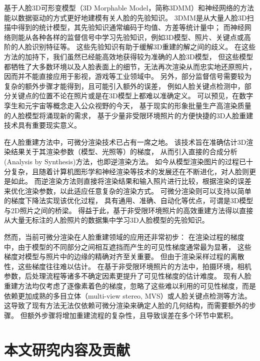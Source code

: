 基于人脸3D可形变模型（3D Morphable Model，简称3DMM）和神经网络的方法能以数据驱动的方式更好地建模有关人脸的先验知识。
3DMM是从大量人脸3D扫描中得到的统计模型，其先验知识通常编码于均值、方差等统计量中；
而神经网络则能从各种各样的监督信号中学习先验知识，例如3D模型、照片、关键点或高阶的人脸识别特征等。
这些先验知识有助于缓解3D重建的解之间的歧义。
在这些方法的加持下，我们虽然已经能高效地获得较为准确的人脸3D模型，
但这些模型都牺牲了大多数环境以及人脸表面上的细节，无法再次渲染从而忠实地还原照片，
因而并不能直接应用于影视，游戏等工业领域中。
另外，部分监督信号需要较为复杂的额外步骤才能得到，且可能引入额外的误差，
例如人脸关键点检测中，部分关键点的位置不论在照片或是在3D模型上都难以准确定义。
可以预见，在数字孪生和元宇宙等概念走入公众视野的今天，
基于现实的形象批量生产高渲染质量的人脸模型将涌现新的需求，
基于少量非受限环境照片的方便快捷的3D人脸重建技术具有重要现实意义。

在人脸重建方法中，可微分渲染技术已占有一席之地。
该技术旨在准确估计3D渲染结果关于其渲染参数（模型、光照等）的梯度，
从而引入直接的合成分析(Analysis by Synthesis)方法，也即逆渲染方法。
如今从模型渲染图片的过程已十分复杂，且随着计算机图形学和神经渲染等技术的发展还在不断进化，对人脸则更是如此。
而逆渲染方法则直接将渲染结果和输入照片进行比较，根据渲染的误差来优化渲染参数，以此适应任意复杂的渲染方式。
可微分渲染则可以支持以简单的梯度下降法实现该优化过程，
具有通用、准确、自动化等优点，可谓是3D模型与2D照片之间的桥梁。
得益于此，基于非受限环境照片的高效重建方法得以直接从大量无标注的人脸照片的数据集中学习3D人脸模型的先验知识。

然而，当前可微分渲染在人脸重建领域的应用还非常初步：
在渲染过程的梯度中，由于模型的不同部分之间相互遮挡而产生的可见性梯度通常最为显著，
这些梯度对模型与照片中的边缘的精确对齐至关重要。
但由于渲染采样过程的离散性，这些梯度往往难以估计。
在基于非受限环境照片的方法中，拍摄环境，相机参数，后处理流程等诸多不确定因素更提升了可见性梯度的估计难度。
现有人脸重建方法均仅考虑了逐像素着色的梯度，忽略了这些难以利用的可见性梯度，而是依赖更加成熟的多目立体（multi-view stereo, MVS）或人脸关键点检测等方法。
这导致了现有方法无法仅依赖可微分渲染来确定人脸的几何结构，而需要额外的步骤。
但额外步骤将增加重建流程的复杂性，且导致误差在多个环节中累积。


\section{本文研究内容及贡献}

